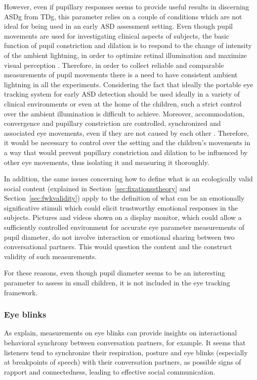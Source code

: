 However, even if pupillary responses seems to provide useful results in discerning ASDg from TDg, this parameter relies on a couple of conditions which are not ideal for being used in an early ASD assessment setting.
Even though pupil movements are used for investigating clinical aspects of subjects, the basic function of pupil constriction and dilation is to respond to the change of intensity of the ambient lightning, in order to optimize retinal illumination and maximize visual perception \citep[p. 502]{adler2011physiology}. Therefore, in order to collect reliable and comparable measurements of pupil movements there is a need to have consistent ambient lightning in all the experiments. Considering the fact that ideally the portable eye tracking system for early ASD detection should be used ideally in a variety of clinical environments or even at the home of the children, such a strict control over the ambient illumination is difficult to achieve. 
Moreover, accommodation, convergence and pupillary constriction are controlled, synchronized and associated eye movements, even if they are not caused by each other \citep[p. 508]{adler2011physiology}. Therefore, it would be necessary to control over the setting and the children's movements in a way that would prevent pupillary constriction and dilation to be influenced by other eye movements, thus isolating it and measuring it thoroughly.

In addition, the same issues concerning how to define what is an ecologically valid social content (explained in Section~\ref{sec:fixationsstheory} and Section~\ref{sec:fwkvalidity}) apply to the definition of what can be an emotionally significative stimuli which could elicit trustworthy emotional responses in the subjects. Pictures and videos shown on a display monitor, which could allow a sufficiently controlled environment for accurate eye parameter measurements of pupil diameter, do not involve interaction or emotional sharing between two conversational partners. This would question the content and the construct validity of such measurements.

For these reasons, even though pupil diameter seems to be an interesting parameter to assess in small children, it is not included in the eye tracking framework.


\subsubsection{Eye blinks}
\label{sec:eyeblinks}
As \cite{nakan02011blinks} explain, measurements on eye blinks can provide insights on interactional behavioral synchrony between conversation partners, for example. It seems that listeners tend to synchronize their respiration, posture and eye blinks (especially at breakpoints of speech) with their conversation partners, as possible signs of rapport and connectedness, leading to effective social communication.

